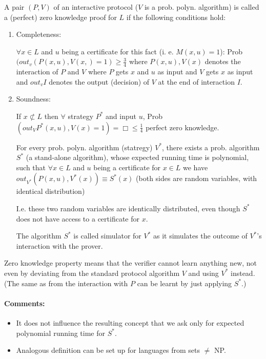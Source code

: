 \documentclass[11pt]{article}
\theoremstyle{definition}
\theoremstyle{definition}
\begin{document}
A pair $ (P, V) $ of an interactive protocol ($ V $ is a prob. polyn. algorithm) is called a (perfect) zero knowledge proof for $ L $ if the following conditions hold:

\begin{enumerate}
\item Completeness:

	$ \forall x \in L $ and $ u $ being a certificate for this fact (i. e. $ M(x, u) = 1$): Prob$(out_v (P(x, u), V(x,) = 1) \geq \frac{3}{4} $ where $ P(x, u), V(x) $ denotes the interaction of $ P $ and $ V $ where $ P $ gets $ x $ and $ u $ as input and $ V $ gets $ x $ as input and $ out_v I $ denotes the output (decision) of $ V $ at the end of interaction $ I $.
	
\item Soundness:

	If $ x \not \subset L $ then $ \forall $ strategy $ P^\ast $ and input $ u $, Prob$( out_V P^\ast (x, u), V(x) = 1) = \Box \leq \frac{1}{4} $ perfect zero knowledge.
	
	For every prob. polyn. algorithm (statregy) $ V ^\ast $, there exists a prob. algorithm $ S^\ast $ (a stand-alone algorithm), whose expected running time is polynomial, such that $ \forall x \in L $ and $ u $ being a certificate for $ x \in L $ we have $ out_{V^\ast} (P(x, u), V^\ast(x)) \equiv S^\ast(x) $ (both sides are random variables, with identical distribution)
	
	I.e. these two random variables are identically distributed, even though $ S^\ast $ does not have access to a certificate for $ x $.
	
	The algorithm $ S^\ast $ is called simulator for $ V^\ast $ as it simulates the outcome of $ V^\ast $'s interaction with the prover.

\end{enumerate}

Zero knowledge property means that the verifier cannot learn anything new, not even by deviating from the standard protocol algorithm $ V $  and using $ V^\ast $ instead. (The same as from the interaction with $ P $ can be learnt by just applying $ S^\ast $.)

\paragraph{Comments:}
\begin{itemize}
\item It does not influence the resulting concept that we ask only for expected polynomial running time for $ S^\ast $.
\item Analogous definition can be set up for languages from sets $ \neq $ NP.
\end{itemize}
\end{document}
